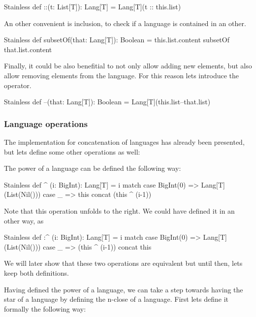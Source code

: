 \begin{ShortCode}{Stainless}
 def ::(t: List[T]): Lang[T] = Lang[T](t :: this.list)
\end{ShortCode}

An other convenient is inclusion, to check if a language is contained in an other. 

\begin{ShortCode}{Stainless}
 def subsetOf(that: Lang[T]): Boolean = 
                  this.list.content subsetOf that.list.content
\end{ShortCode}

Finally, it could be also benefitial to not only allow adding new elements, but also allow removing elements from the language. For this reason lets introduce the \inline{--} operator.

\begin{ShortCode}{Stainless}
def --(that: Lang[T]): Boolean = Lang[T](this.list--that.list)
\end{ShortCode}

\subsubsection{Language operations}

The implementation for concatenation of languages has already been presented, but lets define some other operations as well:

The power of a language can be defined the following way:

\begin{ShortCode}{Stainless}
 def ^ (i: BigInt): Lang[T] = i match {
   case BigInt(0) => Lang[T](List(Nil()))
   case _ => this concat (this ^ (i-1))
 }
\end{ShortCode}

Note that this operation unfolds to the right. We could have defined it in an other way, as 

\begin{ShortCode}{Stainless}
 def :^ (i: BigInt): Lang[T] = i match {
   case BigInt(0) => Lang[T](List(Nil()))
   case _ =>  (this ^ (i-1)) concat this
 }
\end{ShortCode}

We will later show that these two operations are equivalent but until then, lets keep both definitions.

Having defined the power of a language, we can take a step towards having the star of a language by defining the n-close of a language. First lets define it formally the following way: 

